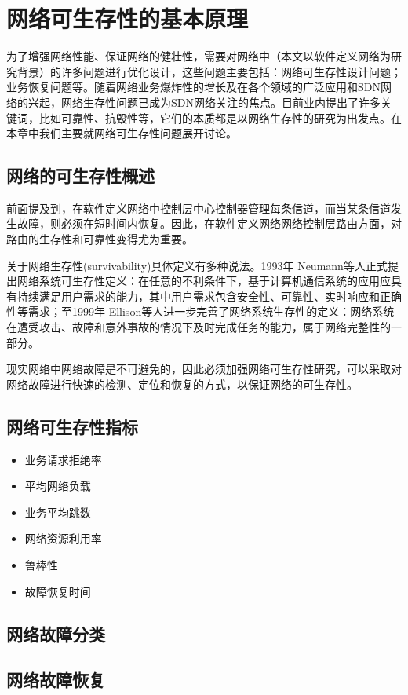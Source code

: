 \chapter{网络可生存性的基本原理}
为了增强网络性能、保证网络的健壮性，需要对网络中（本文以软件定义网络为研究背景）的许多问题进行优化设计，这些问题主要包括：网络可生存性设计问题；业务恢复问题等。随着网络业务爆炸性的增长及在各个领域的广泛应用和SDN网络的兴起，网络生存性问题已成为SDN网络关注的焦点。目前业内提出了许多关键词，比如可靠性、抗毁性等，它们的本质都是以网络生存性的研究为出发点。在本章中我们主要就网络可生存性问题展开讨论。
\section{网络的可生存性概述}
前面提及到，在软件定义网络中控制层中心控制器管理每条信道，而当某条信道发生故障，则必须在短时间内恢复。因此，在软件定义网络网络控制层路由方面，对路由的生存性和可靠性变得尤为重要。

关于网络生存性(survivability)具体定义有多种说法\cite{al2009comparative}。1993年 Neumann\cite{hollway1993survivable}等人正式提出网络系统可生存性定义：在任意的不利条件下，基于计算机通信系统的应用应具有持续满足用户需求的能力，其中用户需求包含安全性、可靠性、实时响应和正确性等需求；至1999年 Ellison\cite{ellison1997survivable}等人进一步完善了网络系统生存性的定义：网络系统在遭受攻击、故障和意外事故的情况下及时完成任务的能力，属于网络完整性的一部分。

现实网络中网络故障是不可避免的，因此必须加强网络可生存性研究，可以采取对网络故障进行快速的检测、定位和恢复的方式，以保证网络的可生存性。

\section{网络可生存性指标}
\begin{itemize}
  \item 业务请求拒绝率
  \item 平均网络负载
  \item 业务平均跳数
  \item 网络资源利用率
  \item 鲁棒性
  \item 故障恢复时间
\end{itemize}

\section{网络故障分类}

\section{网络故障恢复}
